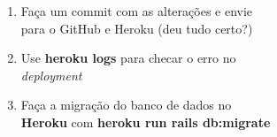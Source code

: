 \documentclass[a4paper,12pt]{article}
\begin{document}
\begin{enumerate}
  \item Faça um commit com as alterações e envie \\
        para o GitHub e Heroku (deu tudo certo?)

  \item Use \textbf{heroku logs} para checar o erro no \\
        \textit{deployment}

  \item Faça a migração do banco de dados no \\
        \textbf{Heroku} com \textbf{heroku run rails db:migrate}
\end{enumerate}
\end{document}
